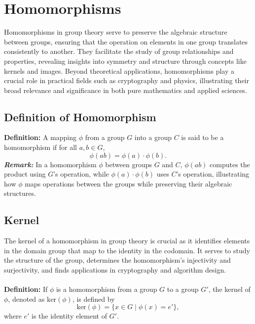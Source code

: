 \chapter{Homomorphisms}
Homomorphisms in group theory serve to preserve the algebraic structure between groups, ensuring that the operation on elements in one group translates consistently to another. They facilitate the study of group relationships and properties, revealing insights into symmetry and structure through concepts like kernels and images. Beyond theoretical applications, homomorphisms play a crucial role in practical fields such as cryptography and physics, illustrating their broad relevance and significance in both pure mathematics and applied sciences.

\section{Definition of Homomorphism}
\textbf{Definition:} A mapping \( \phi \) from a group \( G \) into a group \( C \) is said to be a homomorphism if for all \( a, b \in G \),
\[ \phi(ab) = \phi(a) \cdot \phi(b). \]
\textbf{\textit{Remark: }}In a homomorphism \( \phi \) between groups \( G \) and \( C \), \( \phi(ab) \) computes the product using \( G \)'s operation, while \( \phi(a) \cdot \phi(b) \) uses \( C \)'s operation, illustrating how \( \phi \) maps operations between the groups while preserving their algebraic structures.
\section{Kernel}
The kernel of a homomorphism in group theory is crucial as it identifies elements in the domain group that map to the identity in the codomain. It serves to study the structure of the group, determines the homomorphism's injectivity and surjectivity, and finds applications in cryptography and algorithm design.
\\\\
\textbf{Definition:} If \( \phi \) is a homomorphism from a group \( G \) to a group \( G' \), the kernel of \( \phi \), denoted as \( \text{ker}(\phi) \), is defined by
\[ \text{ker}(\phi) = \{ x \in G \mid \phi(x) = e' \}, \]
where \( e' \) is the identity element of \( G' \).
\\
